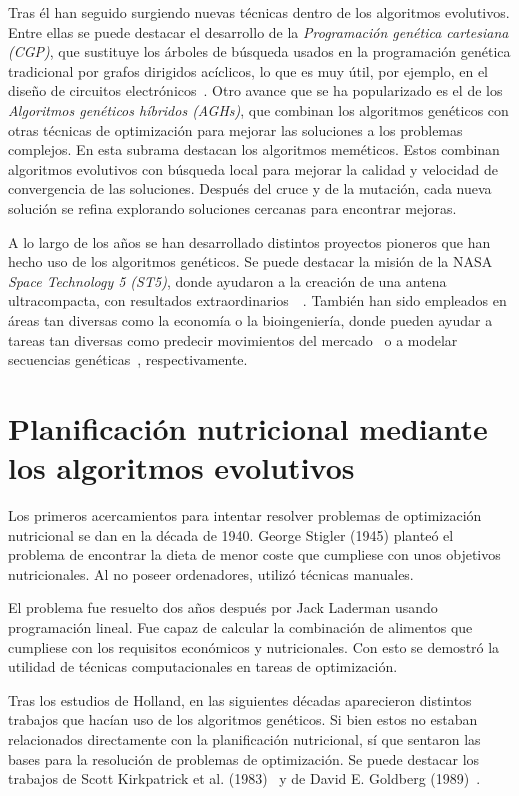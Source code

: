 Tras él han seguido surgiendo nuevas técnicas dentro de los algoritmos evolutivos. Entre ellas se puede destacar el desarrollo de la \textit{Programación genética cartesiana (CGP)}, que sustituye los árboles de búsqueda usados en la programación genética tradicional por grafos dirigidos acíclicos, lo que es muy útil, por ejemplo, en el diseño de circuitos electrónicos~\cite{miller1997}.
\newpage
Otro avance que se ha popularizado es el de los \textit{Algoritmos genéticos híbridos (AGHs)}, que combinan los algoritmos genéticos con otras técnicas de optimización para mejorar las soluciones a los problemas complejos. En esta subrama destacan los algoritmos meméticos. Estos combinan algoritmos evolutivos con búsqueda local para mejorar la calidad y velocidad de convergencia de las soluciones. Después del cruce y de la mutación, cada nueva solución se refina explorando soluciones cercanas para encontrar mejoras.~\cite{moscato2003}

A lo largo de los años se han desarrollado distintos proyectos pioneros que han hecho uso de los algoritmos genéticos. Se puede destacar la misión de la NASA \textit{Space Technology 5 (ST5)}, donde ayudaron a la creación de una antena ultracompacta, con resultados extraordinarios~\cite{NASA2006}~\cite{Lohn2004}. También han sido empleados en áreas tan diversas como la economía o la bioingeniería, donde pueden ayudar a tareas tan diversas como predecir movimientos del mercado~\cite{Abraham2022} o a modelar secuencias genéticas~\cite{notredame1996}, respectivamente.


\section{Planificación nutricional mediante los algoritmos evolutivos}

Los primeros acercamientos para intentar resolver problemas de optimización nutricional se dan en la década de 1940. George Stigler (1945) planteó el problema de encontrar la dieta de menor coste que cumpliese con unos objetivos nutricionales. Al no poseer ordenadores, utilizó técnicas manuales.~\cite{stigler1945}

El problema fue resuelto dos años después por Jack Laderman usando programación lineal. Fue capaz de calcular la combinación de alimentos que cumpliese con los requisitos económicos y nutricionales. Con esto se demostró la utilidad de técnicas computacionales en tareas de optimización.~\cite{ProblemasDeDietas}

Tras los estudios de Holland, en las siguientes décadas aparecieron distintos trabajos que hacían uso de los algoritmos genéticos. Si bien estos no estaban relacionados directamente con la planificación nutricional, sí que sentaron las bases para la resolución de problemas de optimización. Se puede destacar los trabajos de Scott Kirkpatrick et al. (1983)~\cite{kirkpatrick1983} y de David E. Goldberg (1989)~\cite{goldberg1989}.

